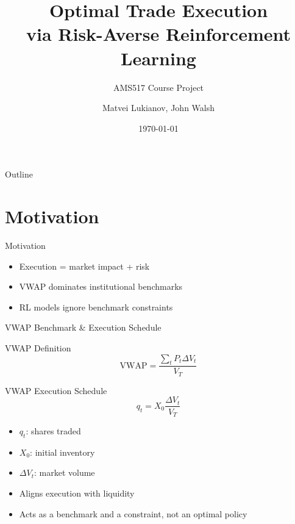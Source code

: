 \documentclass[aspectratio=169, 10pt]{beamer}
\title[Risk-Averse RL for Trade Execution]{%
  Optimal Trade Execution\\[4pt]
  via Risk-Averse Reinforcement Learning}
\subtitle{AMS517 Course Project}
\author{Matvei Lukianov, John Walsh}
\institute{Stony Brook University}
\date{\today}
\begin{document}
\begin{frame}
  \titlepage
\end{frame}

\begin{frame}{Outline}
  \tableofcontents
\end{frame}

\section{Motivation}

\begin{frame}{Motivation}
  \begin{itemize}
    \item Execution = market impact + risk
    \item VWAP dominates institutional benchmarks
    \item RL models ignore benchmark constraints
  \end{itemize}
\end{frame}

\begin{frame}{VWAP Benchmark \& Execution Schedule}
  \begin{block}{VWAP Definition}
    $$\text{VWAP} = \frac{\sum_{t} P_t \Delta V_t}{V_T}$$
  \end{block}
  
  \begin{block}{VWAP Execution Schedule}
    $$q_t = X_0 \frac{\Delta V_t}{V_T}$$
    \begin{itemize}
      \item $q_t$: shares traded
      \item $X_0$: initial inventory
      \item $\Delta V_t$: market volume
    \end{itemize}
  \end{block}

  \begin{itemize}
    \item Aligns execution with liquidity
    \item Acts as a benchmark and a constraint, not an optimal policy
  \end{itemize}
\end{frame}
\end{document}
